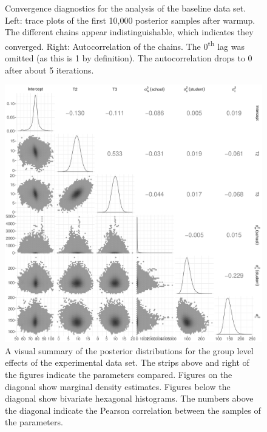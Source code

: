 \documentclass[a4paper]{article}
\begin{document}
\begin{figure}[!ht]
\begin{subfigure}{.5\textwidth}
	\end{subfigure}%
	\caption{
		Convergence diagnostics for the analysis of the baseline data set. Left: trace plots of the first 10,000 posterior samples after warmup. The different chains appear indistinguishable, which indicates they converged. Right: Autocorrelation of the chains. The 0\textsuperscript{th} lag was omitted (as this is 1 by definition). The autocorrelation drops to 0 after about 5 iterations.}
	\label{fig:baselinePosteriorDiagnostics}
\end{figure}



\begin{figure}[!ht]
	\includegraphics[width=\textwidth]{posteriorDescriptivesExperimental}
	\caption{A visual summary of the posterior distributions for the group level effects of the experimental data set. The strips above and right of the figures indicate the parameters compared. Figures on the diagonal show marginal density estimates. Figures below the diagonal show bivariate hexagonal histograms. The numbers above the diagonal indicate the Pearson correlation between the samples of the parameters.}
	\label{fig:productPosteriorDescriptives}
\end{figure}
\end{document}

